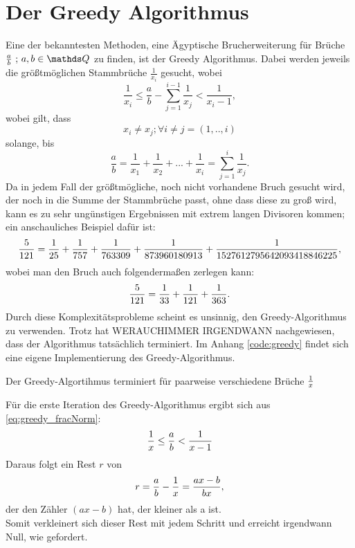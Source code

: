 \section{Der Greedy Algorithmus}
Eine der bekanntesten Methoden, eine Ägyptische  Brucherweiterung
für Brüche $\frac{a}{b} \text{ ; } a, b \in \Q$ zu finden, ist der Greedy Algorithmus. Dabei werden jeweils die größtmöglichen Stammbrüche $\frac{1}{x_i}$ gesucht, wobei
\begin{equation}\label{eq:greedy_fracNorm}
\frac{1}{x_i} \leq \frac{a}{b} - \sum_{j=1}^{i-1} \frac{1}{x_j} < \frac{1}{x_{i}-1},
\end{equation}
wobei gilt, dass
$$x_i \neq x_j; \forall i \neq j = (1,..,i)$$ 
solange, bis
$$\frac{a}{b} = \frac{1}{x_1} + \frac{1}{x_2} + ... + \frac{1}{x_i} = \sum_{j=1}^{i} \frac{1}{x_j}.$$
Da in jedem Fall der größtmögliche, noch nicht vorhandene Bruch gesucht wird, der noch in die Summe der Stammbrüche passt, ohne dass diese zu groß wird, kann es zu sehr ungünstigen Ergebnissen mit extrem langen Divisoren kommen; ein anschauliches Beispiel dafür ist:
$$\frac{5}{121} = \frac{1}{25} + \frac{1}{757} + \frac{1}{763309} + \frac{1}{873960180913} + \frac{1}{1527612795642093418846225},$$
wobei man den Bruch auch folgendermaßen zerlegen kann:
$$\frac{5}{121} = \frac{1}{33} + \frac{1}{121} + \frac{1}{363}.$$
Durch diese Komplexitätsprobleme scheint es unsinnig, den Greedy-Algorithmus zu verwenden. Trotz hat WERAUCHIMMER 
IRGENDWANN  nachgewiesen, dass der Algorithmus tatsächlich terminiert.
Im Anhang \ref{code:greedy} findet sich eine eigene Implementierung des Greedy-Algorithmus.

\begin{satz}
	Der Greedy-Algortihmus terminiert für paarweise verschiedene Brüche $\frac{1}{x}$
\end{satz}
\begin{bew}
	Für die erste Iteration des Greedy-Algorithmus ergibt sich aus \ref{eq:greedy_fracNorm}:
	\begin{equation*}
		\frac{1}{x} \leq \frac{a}{b} < \frac{1}{x-1}
	\end{equation*}
	Daraus folgt ein Rest $r$ von
	$$ r = \frac{a}{b}-\frac{1}{x} = \frac{ax-b}{bx},$$
	der den Zähler $(ax-b)$ hat,  der kleiner als a ist. \\ Somit verkleinert sich dieser Rest mit jedem Schritt und erreicht irgendwann Null, wie gefordert.
\end{bew}


